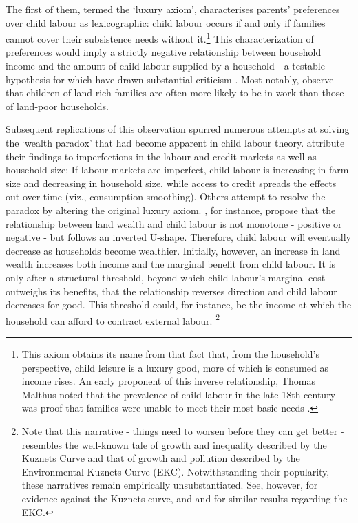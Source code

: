 \documentclass[a4paper,12pt]{article}
\theoremstyle{plain}
\theoremstyle{definition}
\theoremstyle{definition}
\theoremstyle{definition}
\theoremstyle{definition}
\begin{document}
The first of them, termed the `luxury axiom', characterises parents' preferences over child labour as lexicographic: child labour occurs if and only if families cannot cover their subsistence needs without it.\footnote{This axiom obtains its name from that fact that, from the household's perspective, child leisure is a luxury good, more of which is consumed as income rises. An early proponent of this inverse relationship, Thomas Malthus noted that the prevalence of child labour in the late 18th century was proof that families were unable to meet their most basic needs \citep[see][]{Edmonds2007}.} This characterization of preferences would imply a strictly negative relationship between household income and the amount of child labour supplied by a household - a testable hypothesis for which \citet{Basu1998} have drawn substantial criticism \citep[see e.g.][]{Edmonds2012}. Most notably, \citet{Bhalotra2000,Bhalotra2003} observe that children of land-rich families are often more likely to be in work than those of land-poor households.

Subsequent replications of this observation spurred numerous attempts at solving the `wealth paradox' that had become apparent in child labour theory. \citet{Bhalotra2003} attribute their findings to imperfections in the labour and credit markets as well as household size: If labour markets are imperfect, child labour is increasing in farm size and decreasing in household size, while access to credit spreads the effects out over time (viz., consumption smoothing). Others attempt to resolve the paradox by altering the original luxury axiom. \citet{Basu2010}, for instance, propose that the relationship between land wealth and child labour is not monotone - positive or negative - but follows an inverted U-shape. Therefore, child labour will eventually decrease as households become wealthier. Initially, however, an increase in land wealth increases both income and the marginal benefit from child labour. It is only after a structural threshold, beyond which child labour's marginal cost outweighs its benefits, that the relationship reverses direction and child labour decreases for good. This threshold could, for instance, be the income at which the household can afford to contract external labour. \footnote{Note that this narrative - things need to worsen before they can get better -  resembles the well-known tale of growth and inequality described by the Kuznets Curve \citep{Kuznets1955, Kuznets1963} and that of growth and pollution described by the Environmental Kuznets Curve (EKC). Notwithstanding their popularity, these narratives remain empirically unsubstantiated. See, however, \citet{Piketty2014} for evidence against the Kuznets curve, and \citet{Mills2009} and \citet{Ozokcu2017} for similar results regarding the EKC.} 
\end{document}
